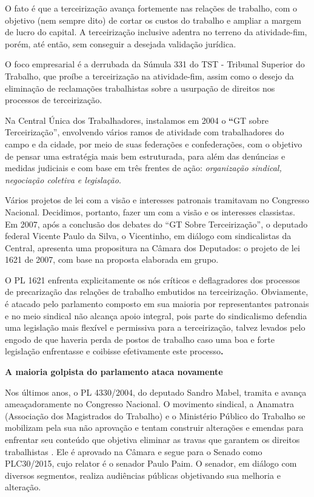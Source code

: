 O fato é que a terceirização avança fortemente nas relações de trabalho,
com o objetivo (nem sempre dito) de cortar os custos do trabalho e
ampliar a margem de lucro do capital. A terceirização inclusive adentra
no terreno da atividade-fim, porém, até então, sem conseguir a desejada
validação jurídica.

O foco empresarial é a derrubada da Súmula 331 do TST - Tribunal
Superior do Trabalho, que proíbe a terceirização na atividade-fim, assim
como o desejo da eliminação de reclamações trabalhistas sobre a
usurpação de direitos nos processos de terceirização.

Na Central Única dos Trabalhadores, instalamos em 2004 o \textbf{``}GT
sobre Terceirização'', envolvendo vários ramos de atividade com
trabalhadores do campo e da cidade, por meio de suas federações e
confederações, com o objetivo de pensar uma estratégia mais bem
estruturada, para além das denúncias e medidas judiciais e com base em
três frentes de ação: \emph{organização sindical, negociação coletiva e
legislação}.

Vários projetos de lei com a visão e interesses patronais tramitavam no
Congresso Nacional. Decidimos, portanto, fazer um com a visão e os
interesses classistas. Em 2007, após a conclusão dos debates do ``GT
Sobre Terceirização'', o deputado federal Vicente Paulo da Silva, o
Vicentinho, em diálogo com sindicalistas da Central, apresenta uma
propositura na Câmara dos Deputados: o projeto de lei 1621 de 2007, com
base na proposta elaborada em grupo.

O PL 1621 enfrenta explicitamente os nós críticos e deflagradores dos
processos de precarização das relações de trabalho embutidos na
terceirização. Obviamente, é atacado pelo parlamento composto em sua
maioria por representantes patronais e no meio sindical não alcança
apoio integral, pois parte do sindicalismo defendia uma legislação mais
flexível e permissiva para a terceirização, talvez levados pelo engodo
de que haveria perda de postos de trabalho caso uma boa e forte
legislação enfrentasse e coibisse efetivamente este processo\textbf{.}

\textbf{A maioria golpista do parlamento ataca novamente}

Nos últimos anos, o PL 4330/2004, do deputado Sandro Mabel, tramita e
avança ameaçadoramente no Congresso Nacional. O movimento sindical, a
Anamatra (Associação dos Magistrados do Trabalho) e o Ministério Público
do Trabalho se mobilizam pela sua não aprovação e tentam construir
alterações e emendas para enfrentar seu conteúdo que objetiva eliminar
as travas que garantem os direitos trabalhistas . Ele é aprovado na
Câmara e segue para o Senado como PLC30/2015, cujo relator é o senador
Paulo Paim. O senador, em diálogo com diversos segmentos, realiza
audiências públicas objetivando sua melhoria e alteração.

